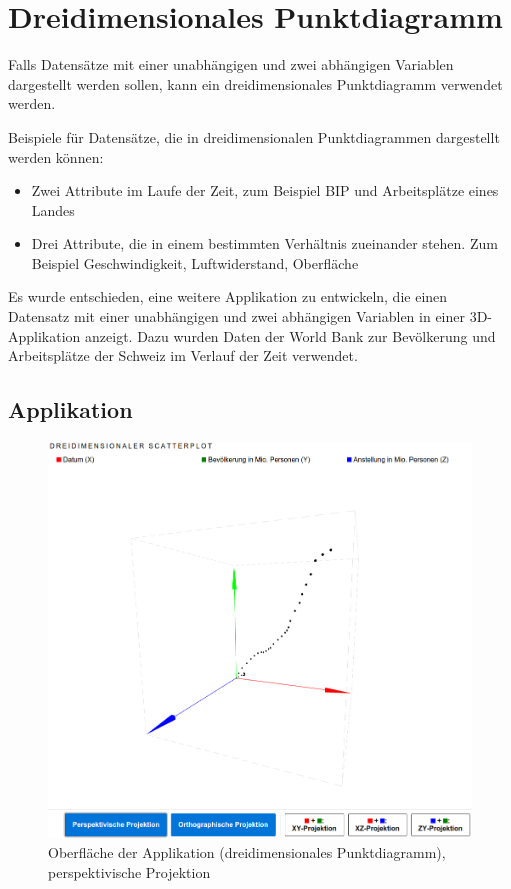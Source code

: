 \section{Dreidimensionales Punktdiagramm}

Falls Datensätze mit einer unabhängigen und zwei abhängigen Variablen dargestellt werden sollen, kann ein dreidimensionales Punktdiagramm verwendet werden.

Beispiele für Datensätze, die in dreidimensionalen Punktdiagrammen dargestellt werden können:

\begin{itemize}
	\item Zwei Attribute im Laufe der Zeit, zum Beispiel BIP und Arbeitsplätze eines Landes
	\item Drei Attribute, die in einem bestimmten Verhältnis zueinander stehen. Zum Beispiel Geschwindigkeit, Luftwiderstand, Oberfläche
\end{itemize}

Es wurde entschieden, eine weitere Applikation zu entwickeln, die einen Datensatz mit einer unabhängigen und zwei abhängigen Variablen in einer 3D-Applikation anzeigt. Dazu wurden Daten der World Bank \cite{worldbank} zur Bevölkerung und Arbeitsplätze der Schweiz im Verlauf der Zeit verwendet.

\subsection{Applikation}

\begin{figure}[H]
	\centering
	\includegraphics[width=\linewidth]{images/3d}
	\caption{Oberfläche der Applikation (dreidimensionales Punktdiagramm), perspektivische Projektion}
	\label{fig:3d}
\end{figure}

